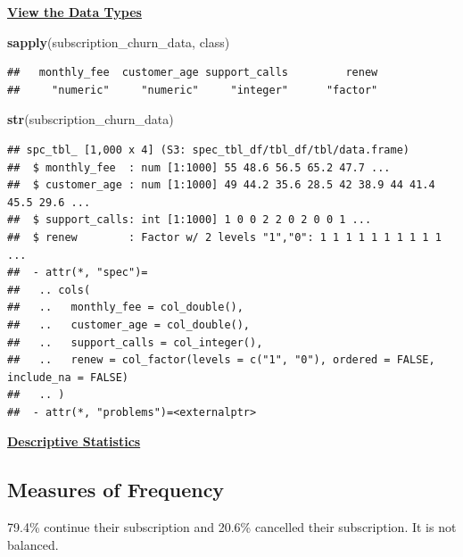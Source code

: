 \documentclass[
]{article}
\newenvironment{Shaded}{\begin{snugshade}}{\end{snugshade}}
\newcommand{\AttributeTok}[1]{\textcolor[rgb]{0.13,0.29,0.53}{#1}}
\newcommand{\DecValTok}[1]{\textcolor[rgb]{0.00,0.00,0.81}{#1}}
\newcommand{\FunctionTok}[1]{\textcolor[rgb]{0.13,0.29,0.53}{\textbf{#1}}}
\newcommand{\NormalTok}[1]{#1}
\newcommand{\OtherTok}[1]{\textcolor[rgb]{0.56,0.35,0.01}{#1}}
\newcommand{\SpecialCharTok}[1]{\textcolor[rgb]{0.81,0.36,0.00}{\textbf{#1}}}
\begin{document}
\ul{\textbf{View the Data Types}}

\begin{Shaded}
\begin{Highlighting}[]
\FunctionTok{sapply}\NormalTok{(subscription\_churn\_data, class)}
\end{Highlighting}
\end{Shaded}

\begin{verbatim}
##   monthly_fee  customer_age support_calls         renew 
##     "numeric"     "numeric"     "integer"      "factor"
\end{verbatim}

\begin{Shaded}
\begin{Highlighting}[]
\FunctionTok{str}\NormalTok{(subscription\_churn\_data)}
\end{Highlighting}
\end{Shaded}

\begin{verbatim}
## spc_tbl_ [1,000 x 4] (S3: spec_tbl_df/tbl_df/tbl/data.frame)
##  $ monthly_fee  : num [1:1000] 55 48.6 56.5 65.2 47.7 ...
##  $ customer_age : num [1:1000] 49 44.2 35.6 28.5 42 38.9 44 41.4 45.5 29.6 ...
##  $ support_calls: int [1:1000] 1 0 0 2 2 0 2 0 0 1 ...
##  $ renew        : Factor w/ 2 levels "1","0": 1 1 1 1 1 1 1 1 1 1 ...
##  - attr(*, "spec")=
##   .. cols(
##   ..   monthly_fee = col_double(),
##   ..   customer_age = col_double(),
##   ..   support_calls = col_integer(),
##   ..   renew = col_factor(levels = c("1", "0"), ordered = FALSE, include_na = FALSE)
##   .. )
##  - attr(*, "problems")=<externalptr>
\end{verbatim}

\ul{\textbf{Descriptive Statistics}}

\subsection{Measures of Frequency}\label{measures-of-frequency}

79.4\% continue their subscription and 20.6\% cancelled their
subscription. It is not balanced.

\begin{Shaded}
\end{Shaded}
\end{document}

